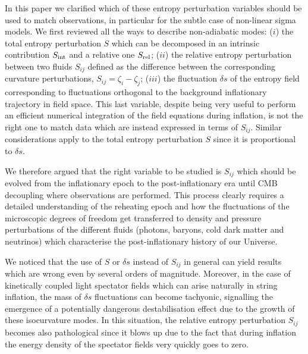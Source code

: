 \documentclass[a4paper,11pt]{article}
\begin{document}
In this paper we clarified which of these entropy perturbation variables should be used to match observations, in particular for the subtle case of non-linear sigma models. We first reviewed all the ways to describe non-adiabatic modes: ($i$) the total entropy perturbation $S$ which can be decomposed in an intrinsic contribution $S_{\rm int}$ and a relative one $S_{\rm rel}$; ($ii$) the relative entropy perturbation between two fluids $S_{ij}$ defined as the difference between the corresponding curvature perturbations, $S_{ij} = \zeta_i-\zeta_j$; ($iii$) the fluctuation $\delta s$ of the entropy field corresponding to fluctuations orthogonal to the background inflationary trajectory in field space. This last variable, despite being very useful to perform an efficient numerical integration of the field equations during inflation, is not the right one to match data which are instead expressed in terms of $S_{ij}$. Similar considerations apply to the total entropy perturbation $S$ since it is proportional to $\delta s$. 

We therefore argued that the right variable to be studied is $S_{ij}$ which should be evolved from the inflationary epoch to the post-inflationary era until CMB decoupling where observations are performed. This process clearly requires a detailed understanding of the reheating epoch and how the fluctuations of the microscopic degrees of freedom get transferred to density and pressure perturbations of the different fluids (photons, baryons, cold dark matter and neutrinos) which characterise the post-inflationary history of our Universe. 

We noticed that the use of $S$ or $\delta s$ instead of $S_{ij}$ in general can yield results which are wrong even by several orders of magnitude. Moreover, in the case of kinetically coupled light spectator fields which can arise naturally in string inflation, the mass of $\delta s$ fluctuations can become tachyonic, signalling the emergence of a potentially dangerous destabilisation effect due to the growth of these isocurvature modes. In this situation, the relative entropy perturbation $S_{ij}$ becomes also pathological since it blows up due to the fact that during inflation the energy density of the spectator fields very quickly goes to zero. 
\end{document}
